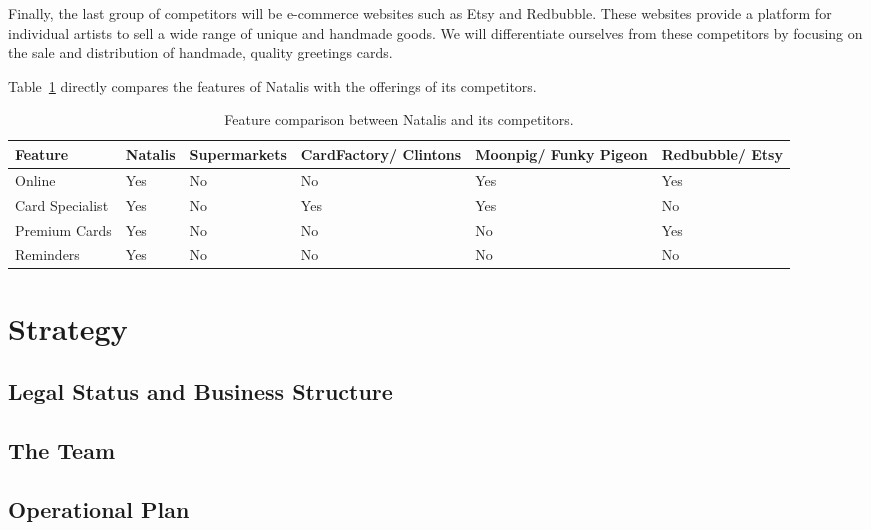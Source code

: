 \documentclass[10pt,a4paper]{article}
\begin{document}
Finally, the last group of competitors will be e-commerce websites such as Etsy and Redbubble. These websites provide a platform for individual artists to sell a wide range of unique and handmade goods. We will differentiate ourselves from these competitors by focusing on the sale and distribution of handmade, quality greetings cards.

Table~\ref{table:competitor_analysis} directly compares the features of Natalis with the offerings of its competitors.

\begin{table}[h]\footnotesize\centering
 \begin{tabular}{ | p{2cm} | p{2cm} | p{2cm} | p{2cm} | p{2cm} | p{2cm} | }
    \hline
    Feature & Natalis & Supermarkets & CardFactory/ Clintons & Moonpig/ Funky Pigeon & Redbubble/ Etsy \\
    \hline
    Online & \cellcolor{tableGreen}Yes & \cellcolor{tableRed}No & \cellcolor{tableRed}No & \cellcolor{tableGreen}Yes & \cellcolor{tableGreen}Yes \\
    Card Specialist & \cellcolor{tableGreen}Yes & \cellcolor{tableRed}No & \cellcolor{tableGreen}Yes & \cellcolor{tableGreen}Yes & \cellcolor{tableRed}No \\
    Premium Cards& \cellcolor{tableGreen}Yes & \cellcolor{tableRed}No & \cellcolor{tableRed}No & \cellcolor{tableRed}No & \cellcolor{tableGreen}Yes \\
    Reminders & \cellcolor{tableGreen}Yes	& \cellcolor{tableRed}No & \cellcolor{tableRed}No & \cellcolor{tableRed}No & \cellcolor{tableRed}No \\
    \hline
  \end{tabular}
  \caption{Feature comparison between Natalis and its competitors.}
	\label{table:competitor_analysis}
\end{table}

\section*{Strategy}
\subsection*{Legal Status and Business Structure}

\subsection*{The Team}

\subsection*{Operational Plan}
\end{document}

